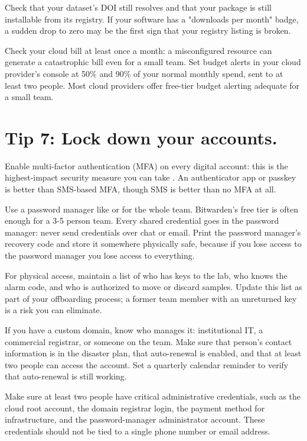 \documentclass[10pt,letterpaper]{article}
\begin{document}
Check that your dataset's DOI still resolves and that your package is still
installable from its registry. If your software has a "downloads per month"
badge, a sudden drop to zero may be the first sign that your registry listing is
broken.

Check your cloud bill at least once a month: a misconfigured resource can
generate a catastrophic bill even for a small team. Set budget alerts in your
cloud provider's console at 50\% and 90\% of your normal monthly spend, sent to
at least two people. Most cloud providers offer free-tier budget alerting
adequate for a small team.

\section*{Tip 7: Lock down your accounts.}

Enable multi-factor authentication (MFA) on every digital account: this is the
highest-impact security measure you can take \cite{smalls2021}. An authenticator
app or passkey is better than SMS-based MFA, though SMS is better than no MFA at
all.

Use a password manager like  or
 for the whole team.  Bitwarden's free tier is
often enough for a 3-5 person team. Every shared credential goes in the password
manager: never send credentials over chat or email. Print the password manager's
recovery code and store it somewhere physically safe, because if you lose access
to the password manager you lose access to everything.

For physical access, maintain a list of who has keys to the lab, who knows the
alarm code, and who is authorized to move or discard samples. Update this list
as part of your offboarding process; a former team member with an unreturned key
is a risk you can eliminate.

If you have a custom domain, know who manages it: institutional IT, a commercial
registrar, or someone on the team. Make sure that person's contact information
is in the disaster plan, that auto-renewal is enabled, and that at least two
people can access the account. Set a quarterly calendar reminder to verify that
auto-renewal is still working.

Make sure at least two people have critical administrative credentials, such as
the cloud root account, the domain registrar login, the payment method for
infrastructure, and the password-manager administrator account.  These
credentials should not be tied to a single phone number or email address.
\end{document}

